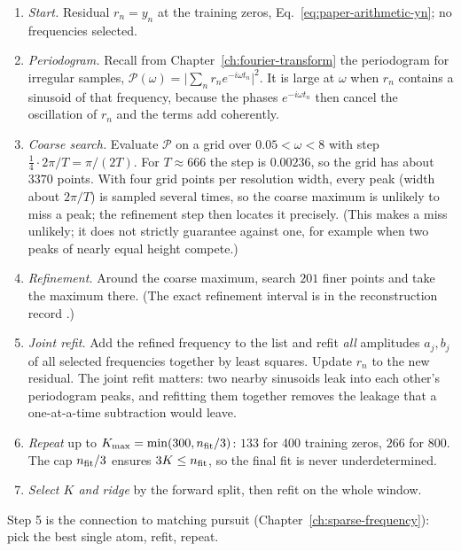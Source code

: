 \begin{enumerate}
\item \emph{Start.} Residual $r_n=y_n$ at the training zeros, Eq.~\eqref{eq:paper-arithmetic-yn}; no frequencies selected.
\item \emph{Periodogram.} Recall from Chapter~\ref{ch:fourier-transform} the periodogram for irregular samples, $\mathcal P(\omega)=\bigl|\sum_n r_n e^{-i\omega t_n}\bigr|^2$. It is large at $\omega$ when $r_n$ contains a sinusoid of that frequency, because the phases $e^{-i\omega t_n}$ then cancel the oscillation of $r_n$ and the terms add coherently.
\item \emph{Coarse search.} Evaluate $\mathcal P$ on a grid over $0.05<\omega<8$ with step $\tfrac14\cdot2\pi/T=\pi/(2T)$. For $T\approx666$ the step is $0.00236$, so the grid has about $3370$ points. With four grid points per resolution width, every peak (width about $2\pi/T$) is sampled several times, so the coarse maximum is unlikely to miss a peak; the refinement step then locates it precisely. (This makes a miss unlikely; it does not strictly guarantee against one, for example when two peaks of nearly equal height compete.)
\item \emph{Refinement.} Around the coarse maximum, search $201$ finer points and take the maximum there. (The exact refinement interval is in the reconstruction record \cite{zenodo}.)
\item \emph{Joint refit.} Add the refined frequency to the list and refit \emph{all} amplitudes $a_j,b_j$ of all selected frequencies together by least squares. Update $r_n$ to the new residual. The joint refit matters: two nearby sinusoids leak into each other's periodogram peaks, and refitting them together removes the leakage that a one-at-a-time subtraction would leave.
\item \emph{Repeat} up to $K_{\max}=\min(300,n_{\rm fit}/3)$: $133$ for 400 training zeros, $266$ for 800. The cap $n_{\rm fit}/3$ ensures $3K\le n_{\rm fit}$, so the final fit is never underdetermined.
\item \emph{Select $K$ and ridge} by the forward split, then refit on the whole window.
\end{enumerate}

Step 5 is the connection to matching pursuit (Chapter~\ref{ch:sparse-frequency}): pick the best single atom, refit, repeat.

